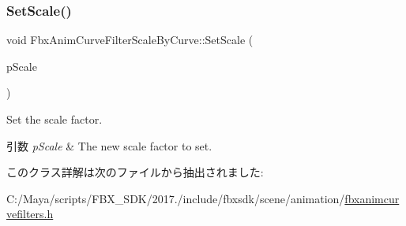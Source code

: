 \mbox{\label{class_fbx_anim_curve_filter_scale_by_curve_afe876ca9b9d674e62b9b7a3839adeef0}} 
\subsubsection{\texorpdfstring{Set\+Scale()}{SetScale()}}
{\footnotesize\ttfamily void Fbx\+Anim\+Curve\+Filter\+Scale\+By\+Curve\+::\+Set\+Scale (\begin{DoxyParamCaption}\item[{\hyperlink{class_fbx_anim_curve}{Fbx\+Anim\+Curve} $\ast$}]{p\+Scale }\end{DoxyParamCaption})}

Set the scale factor. 
\begin{DoxyParams}{引数}
{\em p\+Scale} & The new scale factor to set. \\
\hline
\end{DoxyParams}


このクラス詳解は次のファイルから抽出されました\+:\begin{DoxyCompactItemize}
\item 
C\+:/\+Maya/scripts/\+F\+B\+X\+\_\+\+S\+D\+K/2017./include/fbxsdk/scene/animation/\hyperlink{fbxanimcurvefilters_8h}{fbxanimcurvefilters.\+h}\end{DoxyCompactItemize}
